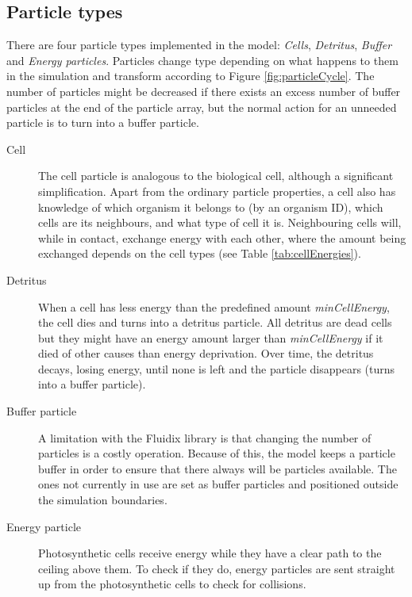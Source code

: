 \subsection{Particle types} \label{subsec:particleTypes}
There are four particle types implemented in the model: \emph{Cells}, \emph{Detritus}, \emph{Buffer} and \emph{Energy particles}. Particles change type depending on what happens to them in the simulation and transform according to Figure \ref{fig:particleCycle}. The number of particles might be decreased if there exists an excess number of buffer particles at the end of the particle array, but the normal action for an unneeded particle is to turn into a buffer particle.
\begin{description}
    \item [Cell] The cell particle is analogous to the biological cell, although a significant simplification. Apart from the ordinary particle properties, a cell also has knowledge of which organism it belongs to (by an organism ID), which cells are its neighbours, and what type of cell it is. Neighbouring cells will, while in contact, exchange energy with each other, where the amount being exchanged depends on the cell types (see Table \ref{tab:cellEnergies}).
    \item [Detritus] When a cell has less energy than the predefined amount \emph{minCellEnergy}, the cell dies and turns into a detritus particle. All detritus are dead cells but they might have an energy amount larger than \emph{minCellEnergy} if it died of other causes than energy deprivation. Over time, the detritus decays, losing energy, until none is left and the particle disappears (turns into a buffer particle).
    \item [Buffer particle] A limitation with the Fluidix library is that changing the number of particles is a costly operation. Because of this, the model keeps a particle buffer in order to ensure that there always will be particles available. The ones not currently in use are set as buffer particles and positioned outside the simulation boundaries. 
    \item [Energy particle] Photosynthetic cells receive energy while they have a clear path to the ceiling above them. To check if they do, energy particles are sent straight up from the photosynthetic cells to check for collisions.
\end{description}
